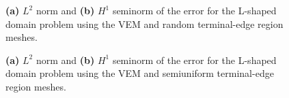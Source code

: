 \begin{figure}[!bth]
\centering     %
{} \hspace{0.5cm}
\caption{\textbf{(a)} $L^2$ norm and \textbf{(b)} $H^1$ seminorm of the error for the L-shaped domain problem using the VEM and random terminal-edge region meshes.}
\label{figs:NormsLshapedRandom} 
\end{figure}

\begin{figure}[!bth]
\centering     %
{} \hspace{0.5cm}
\caption{\textbf{(a)} $L^2$ norm and \textbf{(b)} $H^1$ seminorm of the error for the L-shaped domain problem using the VEM and semiuniform terminal-edge region meshes.}
\label{figs:NormsLshapedSemiuniform} 
\end{figure}

